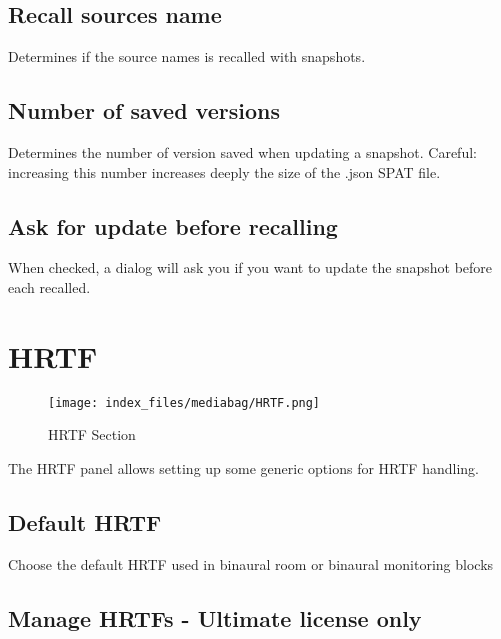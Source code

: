 \documentclass[
  letterpaper,
  DIV=11,
  numbers=noendperiod]{scrreport}
\begin{document}
\hypertarget{recall-sources-name}{%
\subsection{Recall sources name}\label{recall-sources-name}}

Determines if the source names is recalled with snapshots.

\hypertarget{number-of-saved-versions}{%
\subsection{Number of saved versions}\label{number-of-saved-versions}}

Determines the number of version saved when updating a snapshot.
Careful: increasing this number increases deeply the size of the .json
SPAT file.

\hypertarget{ask-for-update-before-recalling}{%
\subsection{Ask for update before
recalling}\label{ask-for-update-before-recalling}}

When checked, a dialog will ask you if you want to update the snapshot
before each recalled.

\hypertarget{hrtf-1}{%
\section{HRTF}\label{hrtf-1}}

\begin{figure}

{\centering \texttt{[image: index\_files/mediabag/HRTF.png]}

}

\caption{HRTF Section}

\end{figure}

The HRTF panel allows setting up some generic options for HRTF handling.

\hypertarget{default-hrtf}{%
\subsection{Default HRTF}\label{default-hrtf}}

Choose the default HRTF used in binaural room or binaural monitoring
blocks

\hypertarget{manage-hrtfs---ultimate-license-only}{%
\subsection{Manage HRTFs - Ultimate license
only}\label{manage-hrtfs---ultimate-license-only}}
\end{document}
